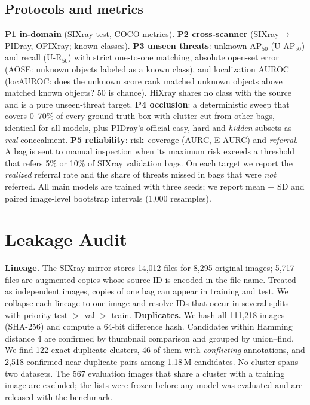 \documentclass[10pt,twocolumn,letterpaper]{article}
\begin{document}
\subsection{Protocols and metrics}
\textbf{P1 in-domain} (SIXray test, COCO metrics). \textbf{P2 cross-scanner} (SIXray$\rightarrow$PIDray, OPIXray; known classes). \textbf{P3 unseen threats}: unknown AP$_{50}$ (U-AP$_{50}$) and recall (U-R$_{50}$) with strict one-to-one matching, absolute open-set error (AOSE: unknown objects labeled as a known class), and localization AUROC (locAUROC: does the unknown score rank matched unknown objects above matched known objects? 50 is chance). HiXray shares no class with the source and is a pure unseen-threat target. \textbf{P4 occlusion}: a deterministic sweep that covers 0--70\% of every ground-truth box with clutter cut from other bags, identical for all models, plus PIDray's official easy, hard and \emph{hidden} subsets as \emph{real} concealment. \textbf{P5 reliability}: risk--coverage (AURC, E-AURC) and \emph{referral}. A bag is sent to manual inspection when its maximum risk exceeds a threshold that refers 5\% or 10\% of SIXray validation bags. On each target we report the \emph{realized} referral rate and the share of threats missed in bags that were \emph{not} referred. All main models are trained with three seeds; we report mean $\pm$ SD and paired image-level bootstrap intervals (1{,}000 resamples).

\section{Leakage Audit}
\label{sec:audit}
\textbf{Lineage.} The SIXray mirror stores 14{,}012 files for 8{,}295 original images; 5{,}717 files are augmented copies whose source ID is encoded in the file name. Treated as independent images, copies of one bag can appear in training and test. We collapse each lineage to one image and resolve IDs that occur in several splits with priority test $>$ val $>$ train.
\textbf{Duplicates.} We hash all 111{,}218 images (SHA-256) and compute a 64-bit difference hash. Candidates within Hamming distance 4 are confirmed by thumbnail comparison and grouped by union--find. We find 122 exact-duplicate clusters, 46 of them with \emph{conflicting} annotations, and 2{,}518 confirmed near-duplicate pairs among 1.18\,M candidates. No cluster spans two datasets. The 567 evaluation images that share a cluster with a training image are excluded; the lists were frozen before any model was evaluated and are released with the benchmark.
\end{document}
